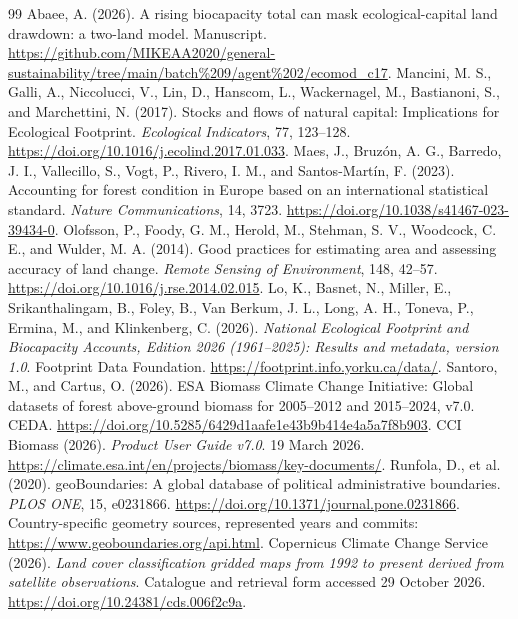 \documentclass[11pt,a4paper]{article}
\begin{document}
\begin{thebibliography}{99}
 Abaee, A. (2026). A rising biocapacity total can mask ecological-capital land drawdown: a two-land model. Manuscript. \url{https://github.com/MIKEAA2020/general-sustainability/tree/main/batch%209/agent%202/ecomod_c17}.
 Mancini, M. S., Galli, A., Niccolucci, V., Lin, D., Hanscom, L., Wackernagel, M., Bastianoni, S., and Marchettini, N. (2017). Stocks and flows of natural capital: Implications for Ecological Footprint. \emph{Ecological Indicators}, 77, 123--128. \url{https://doi.org/10.1016/j.ecolind.2017.01.033}.
 Maes, J., Bruz\'on, A. G., Barredo, J. I., Vallecillo, S., Vogt, P., Rivero, I. M., and Santos-Mart\'in, F. (2023). Accounting for forest condition in Europe based on an international statistical standard. \emph{Nature Communications}, 14, 3723. \url{https://doi.org/10.1038/s41467-023-39434-0}.
 Olofsson, P., Foody, G. M., Herold, M., Stehman, S. V., Woodcock, C. E., and Wulder, M. A. (2014). Good practices for estimating area and assessing accuracy of land change. \emph{Remote Sensing of Environment}, 148, 42--57. \url{https://doi.org/10.1016/j.rse.2014.02.015}.
 Lo, K., Basnet, N., Miller, E., Srikanthalingam, B., Foley, B., Van Berkum, J. L., Long, A. H., Toneva, P., Ermina, M., and Klinkenberg, C. (2026). \emph{National Ecological Footprint and Biocapacity Accounts, Edition 2026 (1961--2025): Results and metadata, version 1.0}. Footprint Data Foundation. \url{https://footprint.info.yorku.ca/data/}.
 Santoro, M., and Cartus, O. (2026). ESA Biomass Climate Change Initiative: Global datasets of forest above-ground biomass for 2005--2012 and 2015--2024, v7.0. CEDA. \url{https://doi.org/10.5285/6429d1aafe1e43b9b414e4a5a7f8b903}.
 CCI Biomass (2026). \emph{Product User Guide v7.0}. 19 March 2026. \url{https://climate.esa.int/en/projects/biomass/key-documents/}.
 Runfola, D., et al. (2020). geoBoundaries: A global database of political administrative boundaries. \emph{PLOS ONE}, 15, e0231866. \url{https://doi.org/10.1371/journal.pone.0231866}. Country-specific geometry sources, represented years and commits: \url{https://www.geoboundaries.org/api.html}.
 Copernicus Climate Change Service (2026). \emph{Land cover classification gridded maps from 1992 to present derived from satellite observations}. Catalogue and retrieval form accessed 29 October 2026. \url{https://doi.org/10.24381/cds.006f2c9a}.

\end{thebibliography}
\end{document}
